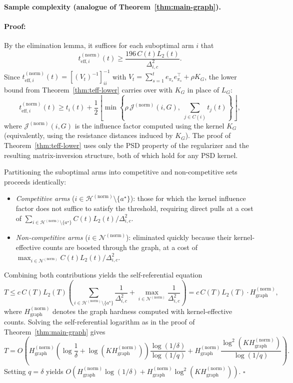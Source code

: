 \documentclass{article}
\newenvironment{proof}{\paragraph{Proof:}}{\hfill$\square$}
\begin{document}
\paragraph{Sample complexity (analogue of Theorem~\ref{thm:main-graph}).}

\begin{proof}
By the elimination lemma, it suffices for each suboptimal arm $i$ that
\[
t_{\mathrm{eff},i}^{(\mathrm{norm})}(t)
\ge
\frac{196\,C(t)L_2(t)}{\Delta_{i,c}^2}.
\]
Since $t_{\mathrm{eff},i}^{(\mathrm{norm})}(t)=[(V_t)^{-1}]_{ii}^{-1}$ with $V_t=\sum_{s=1}^t e_{\pi_s}e_{\pi_s}^\top+\rho K_G$, the lower bound from Theorem~\ref{thm:teff-lower} carries over with $K_G$ in place of $L_G$:
\[
t_{\mathrm{eff},i}^{(\mathrm{norm})}(t)
\ge
t_i(t)+\frac12\left\lfloor\min\!\left\{\rho\,\mathcal J^{(\mathrm{norm})}(i,G),\;\sum_{j\in C(i)}t_j(t)\right\}\right\rfloor,
\]
where $\mathcal J^{(\mathrm{norm})}(i,G)$ is the influence factor computed using the kernel $K_G$ (equivalently, using the resistance distances induced by $K_G$). The proof of Theorem~\ref{thm:teff-lower} uses only the PSD property of the regularizer and the resulting matrix-inversion structure, both of which hold for any PSD kernel.

Partitioning the suboptimal arms into competitive and non-competitive sets proceeds identically:
\begin{itemize}
\item \emph{Competitive arms} ($i\in\mathcal H^{(\mathrm{norm})}\setminus\{a^\star\}$): those for which the kernel influence factor does not suffice to satisfy the threshold, requiring direct pulls at a cost of $\sum_{i\in\mathcal H^{(\mathrm{norm})}\setminus\{a^\star\}}C(t)L_2(t)/\Delta_{i,c}^2$.
\item \emph{Non-competitive arms} ($i\in\mathcal N^{(\mathrm{norm})}$): eliminated quickly because their kernel-effective counts are boosted through the graph, at a cost of $\max_{i\in\mathcal N^{(\mathrm{norm})}} C(t)L_2(t)/\Delta_{i,c}^2$.
\end{itemize}

Combining both contributions yields the self-referential equation
\[
T
\le
c\,C(T)L_2(T)
\left(
\sum_{i\in\mathcal H^{(\mathrm{norm})}\setminus\{a^\star\}}\frac{1}{\Delta_{i,c}^2}
+
\max_{i\in\mathcal N^{(\mathrm{norm})}}\frac{1}{\Delta_{i,c}^2}
\right)
= c\,C(T)L_2(T)\cdot H_{\mathrm{graph}}^{(\mathrm{norm})},
\]
where $H_{\mathrm{graph}}^{(\mathrm{norm})}$ denotes the graph hardness computed with kernel-effective counts. Solving the self-referential logarithm as in the proof of Theorem~\ref{thm:main-graph} gives
\[
T
=
O\!\left(
H_{\mathrm{graph}}^{(\mathrm{norm})}
\left(\log\frac1\delta+\log(KH_{\mathrm{graph}}^{(\mathrm{norm})})\right)
\frac{\log(1/\delta)}{\log(1/q)}
+
H_{\mathrm{graph}}^{(\mathrm{norm})}
\frac{\log^2(KH_{\mathrm{graph}}^{(\mathrm{norm})})}{\log(1/q)}
\right).
\]
Setting $q=\delta$ yields $O\!\left(H_{\mathrm{graph}}^{(\mathrm{norm})}\log(1/\delta)+H_{\mathrm{graph}}^{(\mathrm{norm})}\log^2(KH_{\mathrm{graph}}^{(\mathrm{norm})})\right)$.
\end{proof}
\end{document}
